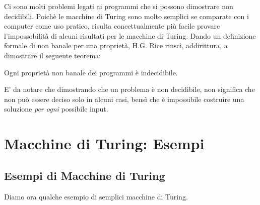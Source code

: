Ci sono molti problemi legati ai programmi che si possono dimostrare
non decidibili. Poich\`e le macchine di Turing sono molto semplici se
comparate con i computer come uso pratico, risulta concettualmente
pi\`u facile provare l'impossobilit\`a di alcuni risultati per le
macchine di Turing. Dando un definizione formale di non banale per una
propriet\`a, H.G. Rice riusc\`i, addirittura, a dimostrare il seguente
teorema:

\begin{thm}
Ogni propriet\`a non banale dei programmi \`e indecidibile.
\end{thm}

E' da notare che dimostrando che un problema \`e non decidibile, non
significa che non pu\`o essere deciso solo in alcuni casi, bens\`i che
\`e impossibile costruire una soluzione \textit{per ogni} possibile
input.




\chapter{Macchine di Turing: Esempi}


\section{Esempi di Macchine di Turing}
Diamo ora qualche esempio di semplici macchine di Turing.\\

